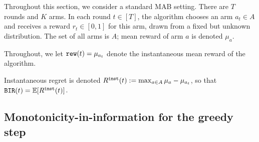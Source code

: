 
\newcommand{\ExplorExploit}{\term{ExplorExploit}}
\newcommand{\PhasedExplorExploit}{\term{PhasedExplorExploit}}
\newcommand{\SuccesiveEliminationReset}{\term{SuccesiveEliminationReset}}

\newcommand{\IReg}{R^{\term{inst}}} %





Throughout this section, we consider a standard MAB setting. There are $T$ rounds and $K$ arms. In each round $t\in [T]$, the algorithm chooses an arm $a_t\in A$ and receives a reward $r_t\in[0,1]$ for this arm, drawn from a fixed but unknown distribution. The set of all arms is $A$; mean reward of arm $a$ is denoted $\mu_a$. 

Throughout, we let
    $\mathtt{rew}(t) = \mu_{a_t}$
denote the instantaneous mean reward of the algorithm.

Instantaneous regret is denoted
    $\IReg(t) := \max_{a\in A} \mu_a - \mu_{a_t}$,
so that 
    $\BIR(t) = \E[\IReg(t)]$.

\subsection{Monotonicity-in-information for the greedy step}
\label{sec:MAB-greedy}


 
